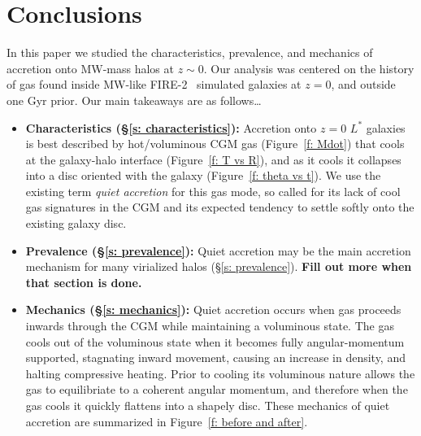 \documentclass[fleqn,usenatbib]{mnras}
\begin{document}




\section{Conclusions}
\label{s: conclusions}

In this paper we studied the characteristics, prevalence, and mechanics of accretion onto MW-mass halos at $z \sim 0$.
Our analysis was centered on the history of gas found inside MW-like FIRE-2~\citep{Hopkins2018} simulated galaxies at $z=0$, and outside one Gyr prior.
Our main takeaways are as follows\ldots
\begin{itemize}
    \item \textbf{Characteristics (\S\ref{s: characteristics}):}
    Accretion onto $z=0$ $L^*$ galaxies is best described by hot/voluminous CGM gas (Figure~\ref{f: Mdot}) that cools at the galaxy-halo interface (Figure~\ref{f: T vs R}), and as it cools it collapses into a disc oriented with the galaxy (Figure~\ref{f: theta vs t}).
    We use the existing term \textit{quiet accretion} for this gas mode, so called for its lack of cool gas signatures in the CGM and its expected tendency to settle softly onto the existing galaxy disc.
    \item \textbf{Prevalence (\S\ref{s: prevalence}):} Quiet accretion may be the main accretion mechanism for many virialized halos (\S\ref{s: prevalence}).
    \textbf{Fill out more when that section is done.}
    \item \textbf{Mechanics (\S\ref{s: mechanics}):}
    Quiet accretion occurs when gas proceeds inwards through the CGM while maintaining a voluminous state.
    The gas cools out of the voluminous state when it becomes fully angular-momentum supported, stagnating inward movement, causing an increase in density, and halting compressive heating.
    Prior to cooling its voluminous nature allows the gas to equilibriate to a coherent angular momentum, and therefore when the gas cools it quickly flattens into a shapely disc.
    These mechanics of quiet accretion are summarized in Figure~\ref{f: before and after}.
\end{itemize}
\end{document}
